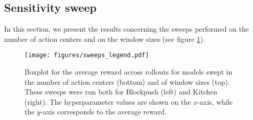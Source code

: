 \subsection{Sensitivity sweep}\label{sensitivity-sweep}

In this section, we present the results concerning the sweeps performed on the number of action centers and on the window sizes (see figure \ref{fig:sensitivity-sweep}).

\begin{figure}[htb]
\texttt{[image: figures/sweeps\_legend.pdf]}
\centering
\caption{Boxplot for the average reward across rollouts for models swept in the number of action centers (bottom) and of window sizes (top). 
These sweeps were run both for Blockpush (left) and Kitchen (right).
The hyperparameter values are shown on the $x$-axis, while the $y$-axis corresponds to the average reward.}
\label{fig:sensitivity-sweep}
\end{figure}
